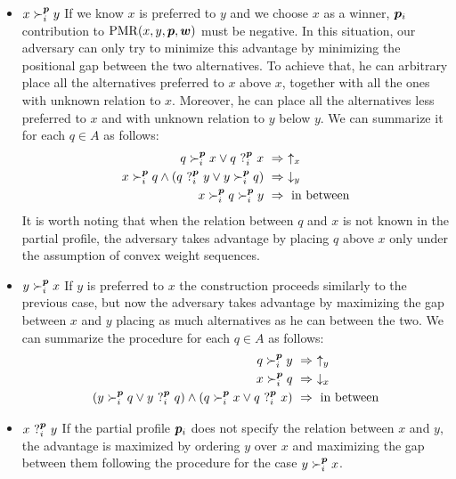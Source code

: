 \begin{itemize}
	\item $x \succ_i^{\bm{p}} y$
	\newline If we know $x$ is preferred to $y$ and we choose $x$ as a winner, ${\bm{p}}_i$ contribution to $\operatorname{PMR}(x,y,{\bm{p}},\bm{w})$ must be negative. In this situation, our adversary can only try to minimize this advantage by minimizing the positional gap between the two alternatives. To achieve that, he can arbitrary place all the alternatives preferred to $x$ above $x$, together with all the ones with unknown relation to $x$. Moreover, he can place all the alternatives less preferred to $x$ and with unknown relation to $y$ below $y$. We can summarize it for each $q \in A$ as follows:
	\begin{align*}
	q \succ_i^\pprofile x \vee q \ ?_i^\pprofile \ x \ & \Rightarrow \ \uparrow_x \\
	x \succ_i^\pprofile q \wedge ( q \ ?_i^\pprofile \ y \vee y \succ_i^\pprofile q) \ & \Rightarrow \ \downarrow_y \\
	x \succ_i^\pprofile q \succ_i^\pprofile y \ & \Rightarrow \ \text{in between} \\
	\end{align*}
	It is worth noting that when the relation between $q$ and $x$ is not known in the partial profile, the adversary takes advantage by placing $q$ above $x$ only under the assumption of convex weight sequences.
	\item $y \succ_i^{\bm{p}} x$
	\newline If $y$ is preferred to $x$ the construction proceeds similarly to the previous case, but now the adversary takes advantage by maximizing the gap between $x$ and $y$ placing as much alternatives as he can between the two. We can summarize the procedure for each $q \in A$ as follows:
	\begin{align*}
	q \succ_i^\pprofile y \ & \Rightarrow \ \uparrow_y \\
	x \succ_i^\pprofile q \ & \Rightarrow \ \downarrow_x \\
	(y \succ_i^\pprofile q \vee y \ ?_i^\pprofile \ q) \wedge (q \succ_i^\pprofile x \vee q \ ?_i^\pprofile \ x) \ & \Rightarrow \ \text{in between} \\
	\end{align*}
	\item $x \ ?_i^{\bm{p}} \ y$
	\newline If the partial profile ${\bm{p}}_i$ does not specify the relation between $x$ and $y$, the advantage is maximized by ordering $y$ over $x$ and maximizing the gap between them following the procedure for the case $y \succ_i^{\bm{p}} x$.
\end{itemize}

